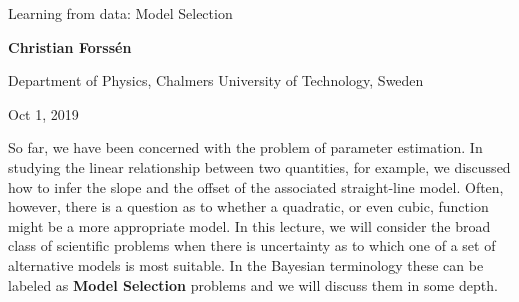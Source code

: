\documentclass[%
oneside,                 %
final,                   %
10pt]{article}
\begin{document}

\newcommand{\exercisesection}[1]{\subsection*{#1}}







\thispagestyle{empty}

\begin{center}
{\LARGE\bf
\begin{spacing}{1.25}
Learning from data: Model Selection
\end{spacing}
}
\end{center}


\begin{center}
{\bf Christian Forssén}
\end{center}

    \begin{center}
\centerline{{\small Department of Physics, Chalmers University of Technology, Sweden}}
\end{center}
    

\begin{center}
Oct 1, 2019
\end{center}

\vspace{1cm}


So far, we have been concerned with the problem of parameter estimation. In studying the linear relationship between two quantities, for example, we discussed how to infer the slope and the offset of the associated straight-line model. Often, however, there is a question as to whether a quadratic, or even cubic, function might be a more appropriate model. In this lecture, we will consider the broad class of scientific problems when there is uncertainty as to which one of a set of alternative models is most suitable. In the Bayesian terminology these can be labeled as \textbf{Model Selection} problems and we will discuss them in some depth.
\end{document}
